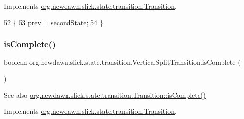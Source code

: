 Implements \mbox{\hyperlink{interfaceorg_1_1newdawn_1_1slick_1_1state_1_1transition_1_1_transition_a7b59f0c9205f1f0417ee18bc526e5b01}{org.\+newdawn.\+slick.\+state.\+transition.\+Transition}}.


\begin{DoxyCode}
52                                                                   \{
53         \mbox{\hyperlink{classorg_1_1newdawn_1_1slick_1_1state_1_1transition_1_1_vertical_split_transition_ac864a869b7644faded54193f3aa2b436}{prev}} = secondState;
54     \}
\end{DoxyCode}
\mbox{\label{classorg_1_1newdawn_1_1slick_1_1state_1_1transition_1_1_vertical_split_transition_ac2ff9b2c7c657194cfe9e77f2573ef82}} 
\subsubsection{\texorpdfstring{is\+Complete()}{isComplete()}}
{\footnotesize\ttfamily boolean org.\+newdawn.\+slick.\+state.\+transition.\+Vertical\+Split\+Transition.\+is\+Complete (\begin{DoxyParamCaption}{ }\end{DoxyParamCaption})\hspace{0.3cm}{\ttfamily [inline]}}

\begin{DoxySeeAlso}{See also}
\mbox{\hyperlink{interfaceorg_1_1newdawn_1_1slick_1_1state_1_1transition_1_1_transition_af397d5185cf09c30c3f51d5021d63815}{org.\+newdawn.\+slick.\+state.\+transition.\+Transition\+::is\+Complete()}} 
\end{DoxySeeAlso}


Implements \mbox{\hyperlink{interfaceorg_1_1newdawn_1_1slick_1_1state_1_1transition_1_1_transition_af397d5185cf09c30c3f51d5021d63815}{org.\+newdawn.\+slick.\+state.\+transition.\+Transition}}.


